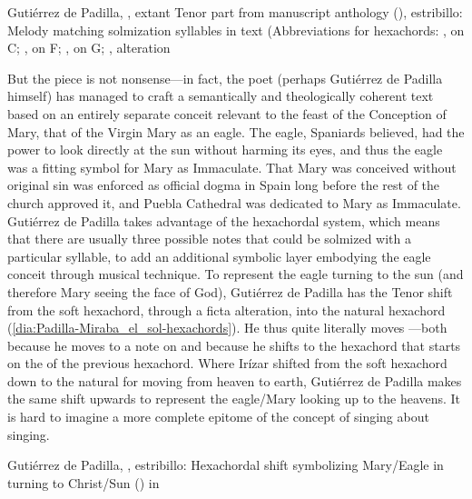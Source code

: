{Gutiérrez de Padilla, , extant Tenor part from
manuscript anthology (), estribillo: Melody matching
solmization syllables in text (Abbreviations for hexachords: ,
 on C; ,  on F; , 
on G; ,  alteration}

But the piece is not nonsense---in fact, the poet (perhaps Gutiérrez de Padilla
himself) has managed to craft a semantically and theologically coherent text
based on an entirely separate conceit relevant to the feast of the Conception
of Mary, that of the Virgin Mary as an eagle.
The eagle, Spaniards believed, had the power to look directly at the sun
without harming its eyes, and thus the eagle was a fitting symbol for Mary as
Immaculate.%
    \Autocite[]{Covarrubias:Tesoro} %
That Mary was conceived without original sin was enforced as official dogma in
Spain long before the rest of the church approved it, and Puebla Cathedral was
dedicated to Mary as Immaculate.
Gutiérrez de Padilla takes advantage of the hexachordal system, which means
that there are usually three possible notes that could be solmized with a
particular syllable, to add an additional symbolic layer embodying the eagle
conceit through musical technique.
To represent the eagle turning to the sun (and therefore Mary seeing the face
of God), Gutiérrez de Padilla has the Tenor shift from the soft hexachord,
through a ficta alteration, into the natural hexachord
(\cref{dia:Padilla-Miraba_el_sol-hexachords}).
He thus quite literally moves ---both because he moves to a
note on  and because he shifts to the hexachord that starts on the
 of the previous hexachord.
Where Irízar shifted from the soft hexachord down to the natural for moving from
heaven to earth, Gutiérrez de Padilla makes the same shift upwards to represent
the eagle/Mary looking up to the heavens.
It is hard to imagine a more complete epitome of the concept of singing about
singing.

{Gutiérrez de Padilla, , estribillo: Hexachordal shift
symbolizing Mary/Eagle in  turning to
Christ/Sun () in }

